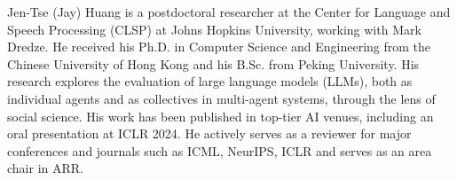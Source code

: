 Jen-Tse (Jay) Huang is a postdoctoral researcher at the Center for Language and Speech Processing (CLSP) at Johns Hopkins University, working with Mark Dredze. He received his Ph.D. in Computer Science and Engineering from the Chinese University of Hong Kong and his B.Sc. from Peking University. His research explores the evaluation of large language models (LLMs), both as individual agents and as collectives in multi-agent systems, through the lens of social science. His work has been published in top-tier AI venues, including an oral presentation at ICLR 2024. He actively serves as a reviewer for major conferences and journals such as ICML, NeurIPS, ICLR and serves as an area chair in ARR.